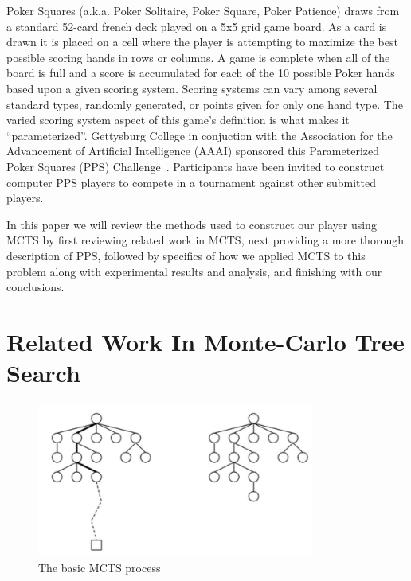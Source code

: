 \documentclass[letterpaper]{article}
\begin{document}
Poker Squares (a.k.a. Poker Solitaire, Poker Square, Poker Patience) draws from a standard 52-card french deck played on a 5x5 grid game board. As a card is drawn it is placed on a cell where the player is attempting to maximize the best possible scoring hands in rows or columns. A game is complete when all of the board is full and a score is accumulated for each of the 10 possible Poker hands based upon a given scoring system. Scoring systems can vary among several standard types, randomly generated, or points given for only one hand type. The varied scoring system aspect of this game's definition is what makes it ``parameterized''. Gettysburg College in conjuction with the Association for the Advancement of Artificial Intelligence (AAAI) sponsored this Parameterized Poker Squares (PPS) Challenge~\cite{neller2014nsg}. Participants have been invited to construct computer PPS players to compete in a  tournament against other submitted players.

In this paper we will review the methods used to construct our player using MCTS by first reviewing related work in MCTS, next providing a more thorough description of PPS, followed by specifics of how we applied MCTS to this problem along with experimental results and analysis, and finishing with our conclusions.

\section{Related Work In Monte-Carlo Tree Search}

\begin{figure}
\begin{center}
\includegraphics[width=.95\linewidth,height=2.0in]{images/basicprocess.png}
\end{center}
\caption{The basic MCTS process}
\label{fig:BASIC}
\end{figure}
\end{document}
